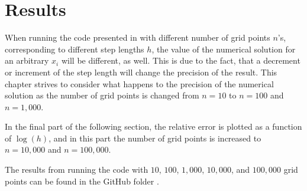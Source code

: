 \chapter{Results}
\label{chap:Results}
When running the code presented in  with different number of grid points $n$'s, corresponding to different step lengths $h$, the value of the numerical solution for an arbitrary $x_i$ will be different, as well.
This is due to the fact, that a decrement or increment of the step length will change the precision of the result. 
This chapter strives to consider what happens to the precision of the numerical solution as the number of grid points is changed from $n=10$ to $n=100$ and $n=1,000$. 

In the final part of the following section, the relative error is plotted as a function of $\log(h)$, and in this part the number of grid points is increased to $n=10,000$ and $n=100,000$.

The results from running the code with $10$, $100$, $1,000$, $10,000$, and $100,000$ grid points can be found in the GitHub folder  .  